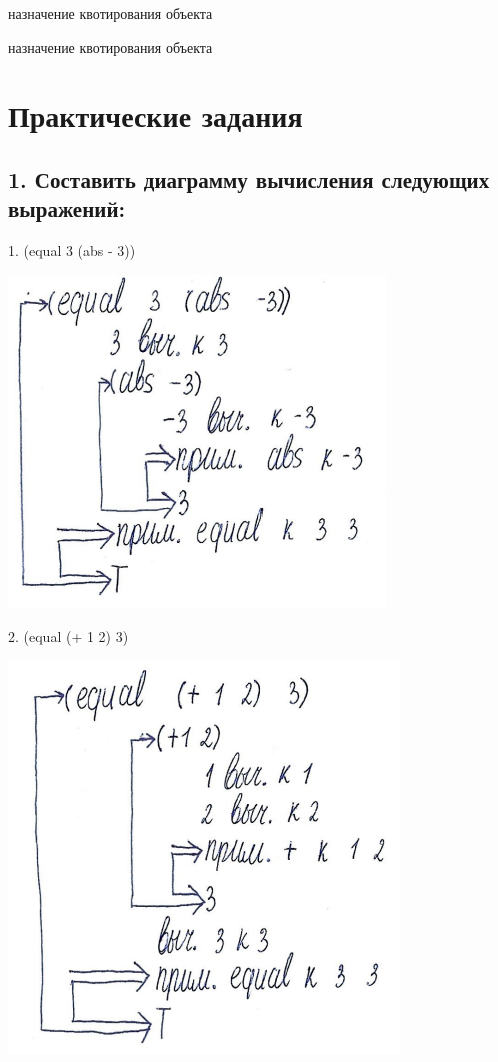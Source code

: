 \documentclass[12pt]{report}
\begin{document}
назначение квотирования объекта

 назначение
квотирования объекта



	
\chapter*{Практические задания}	

\section*{1. Составить диаграмму вычисления следующих выражений:
}

1. (equal 3 (abs - 3))

\includegraphics[scale=1.5]{img/1.1}

2. (equal (+ 1 2) 3)

\includegraphics[scale=1.5]{img/1.2}
\end{document}
